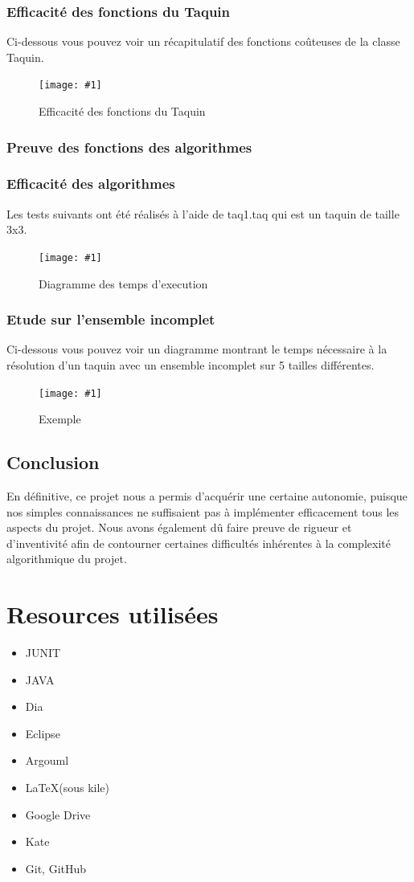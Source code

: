 ﻿\documentclass[a4paper,twoside,12pt]{report}
\newcommand{\monimage}[4]{
\par\noindent
\begin{figure}[H] %
\begin{center}
\texttt{[image: \#1]} %
\caption{#2} %
\label{#3} %
\end{center}
\end{figure} %
}
\begin{document}
\subsection{Efficacité des fonctions du Taquin}
%
Ci-dessous vous pouvez voir un récapitulatif des fonctions coûteuses de la classe Taquin.
\monimage{taquinSpeed.png}{Efficacité des fonctions du Taquin}{Eff}{0.6}
\subsection{Preuve des fonctions des algorithmes}
%
\subsection{Efficacité des algorithmes}
Les tests suivants ont été réalisés à l'aide de taq1.taq qui est un taquin de taille 3x3.
\monimage{algoSpeed.png}{Diagramme des temps d'execution}{tempsExec}{0.6}

\subsection{Etude sur l'ensemble incomplet}
Ci-dessous vous pouvez voir un diagramme montrant le temps nécessaire à la résolution d'un taquin avec un ensemble incomplet sur 5 tailles différentes.
\monimage{ensembleincomplettest2.pdf}{Exemple}{EX}{0.6}

\section{Conclusion}
%
En définitive, ce projet nous a permis d'acquérir une certaine autonomie, puisque nos simples connaissances ne suffisaient pas à implémenter efficacement tous les aspects du projet.
Nous avons également dû faire preuve de rigueur et d'inventivité afin de contourner certaines difficultés inhérentes à la complexité algorithmique du projet.
\chapter{Resources utilisées}
\begin{itemize}
 \item JUNIT
 \item JAVA
 \item Dia
 \item Eclipse
 \item Argouml
 \item \LaTeX (sous kile)
 \item Google Drive
 \item Kate
 \item Git, GitHub
\end{itemize}
\end{document}
